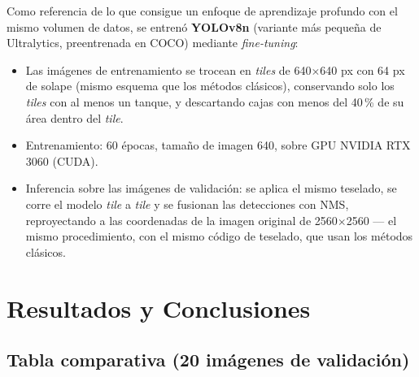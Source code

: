 \documentclass[11pt,a4paper]{article}
\begin{document}
Como referencia de lo que consigue un enfoque de aprendizaje profundo con el mismo
volumen de datos, se entrenó \textbf{YOLOv8n} (variante más pequeña de Ultralytics,
preentrenada en COCO) mediante \emph{fine-tuning}:

\begin{itemize}
    \item Las imágenes de entrenamiento se trocean en \emph{tiles} de
    640$\times$640 px con 64 px de solape (mismo esquema que los métodos
    clásicos), conservando solo los \emph{tiles} con al menos un tanque, y
    descartando cajas con menos del 40\,\% de su área dentro del \emph{tile}.
    \item Entrenamiento: 60 épocas, tamaño de imagen 640, sobre GPU NVIDIA RTX
    3060 (CUDA).
    \item Inferencia sobre las imágenes de validación: se aplica el mismo
    teselado, se corre el modelo \emph{tile} a \emph{tile} y se fusionan las
    detecciones con NMS, reproyectando a las coordenadas de la imagen original de
    2560$\times$2560 --- el mismo procedimiento, con el mismo código de teselado,
    que usan los métodos clásicos.
\end{itemize}

\section{Resultados y Conclusiones}
\label{sec:resultados}

\subsection{Tabla comparativa (20 imágenes de validación)}
\end{document}
